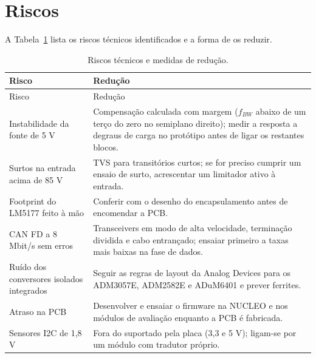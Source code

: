 \endgroup

\section{Riscos}
\label{sec:proj-riscos}

A Tabela~\ref{tab:proj-riscos} lista os riscos técnicos identificados e a
forma de os reduzir.

\begingroup
\small
{}
\renewcommand{\arraystretch}{1.12}
\begin{longtable}{@{}>{\raggedright\arraybackslash}p{}>{\raggedright\arraybackslash}p{}@{}}
\caption{Riscos técnicos e medidas de redução.}\label{tab:proj-riscos}\\
\toprule
\rowcolor{LasetTint}
Risco & Redução \\
\midrule
\endfirsthead
\toprule
\rowcolor{LasetTint}
Risco & Redução \\
\midrule
\endhead
\bottomrule
\endlastfoot
Instabilidade da fonte de 5 V & Compensação calculada com margem ($f_{BW}$ abaixo de um terço do zero no semiplano direito); medir a resposta a degraus de carga no protótipo antes de ligar os restantes blocos. \\
Surtos na entrada acima de 85 V & TVS para transitórios curtos; se for preciso cumprir um ensaio de surto, acrescentar um limitador ativo à entrada. \\
Footprint do LM5177 feito à mão & Conferir com o desenho do encapsulamento antes de encomendar a PCB. \\
CAN FD a 8 Mbit/s sem erros & Transceivers em modo de alta velocidade, terminação dividida e cabo entrançado; ensaiar primeiro a taxas mais baixas na fase de dados. \\
Ruído dos conversores isolados integrados & Seguir as regras de layout da Analog Devices para os ADM3057E, ADM2582E e ADuM6401 e prever ferrites. \\
Atraso na PCB & Desenvolver e ensaiar o firmware na NUCLEO e nos módulos de avaliação enquanto a PCB é fabricada. \\
Sensores I2C de 1,8 V & Fora do suportado pela placa (3,3 e 5 V); ligam-se por um módulo com tradutor próprio. \\
\end{longtable}
\endgroup

